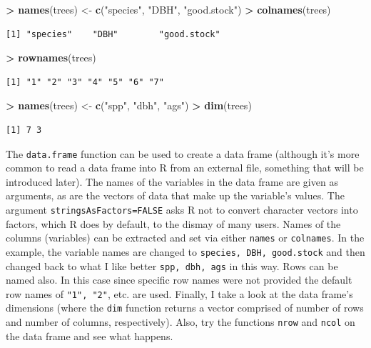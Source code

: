 \documentclass[]{krantz}
\makeatletter
\newenvironment{Shaded}{\begin{snugshade}}{\end{snugshade}}
\newcommand{\KeywordTok}[1]{\textcolor[rgb]{0.27,0.27,0.27}{\textbf{#1}}}
\newcommand{\StringTok}[1]{\textcolor[rgb]{0.5,0.5,0.5}{#1}}
\newcommand{\OperatorTok}[1]{\textcolor[rgb]{0.43,0.43,0.43}{\textbf{#1}}}
\newcommand{\NormalTok}[1]{#1}
\newenvironment{kframe}{%
\medskip{}
\setlength{\fboxsep}{.8em}
 \def\at@end@of@kframe{}%
 \ifinner\ifhmode%
  \def\at@end@of@kframe{\end{minipage}}%
  \begin{minipage}{\columnwidth}%
 \fi\fi%
 \def\FrameCommand##1{\hskip\@totalleftmargin \hskip-\fboxsep
 \colorbox{shadecolor}{##1}\hskip-\fboxsep
     \hskip-\linewidth \hskip-\@totalleftmargin \hskip\columnwidth}%
 \MakeFramed {\advance\hsize-\width
   \@totalleftmargin\z@ \linewidth\hsize
   \@setminipage}}%
 {\par\unskip\endMakeFramed%
 \at@end@of@kframe}
\renewenvironment{Shaded}{\begin{kframe}}{\end{kframe}}
\theoremstyle{definition}
\theoremstyle{definition}
\theoremstyle{definition}
\theoremstyle{remark}
\makeatother
\begin{document}
\begin{Shaded}
\begin{Highlighting}[]
\OperatorTok{>}\StringTok{ }\KeywordTok{names}\NormalTok{(trees) <-}\StringTok{ }\KeywordTok{c}\NormalTok{(}\StringTok{"species"}\NormalTok{, }\StringTok{"DBH"}\NormalTok{, }\StringTok{"good.stock"}\NormalTok{)}
\OperatorTok{>}\StringTok{ }\KeywordTok{colnames}\NormalTok{(trees)}
\end{Highlighting}
\end{Shaded}

\begin{verbatim}
[1] "species"    "DBH"        "good.stock"
\end{verbatim}

\begin{Shaded}
\begin{Highlighting}[]
\OperatorTok{>}\StringTok{ }\KeywordTok{rownames}\NormalTok{(trees)}
\end{Highlighting}
\end{Shaded}

\begin{verbatim}
[1] "1" "2" "3" "4" "5" "6" "7"
\end{verbatim}

\begin{Shaded}
\begin{Highlighting}[]
\OperatorTok{>}\StringTok{ }\KeywordTok{names}\NormalTok{(trees) <-}\StringTok{ }\KeywordTok{c}\NormalTok{(}\StringTok{"spp"}\NormalTok{, }\StringTok{"dbh"}\NormalTok{, }\StringTok{"ags"}\NormalTok{)}
\OperatorTok{>}\StringTok{ }\KeywordTok{dim}\NormalTok{(trees)}
\end{Highlighting}
\end{Shaded}

\begin{verbatim}
[1] 7 3
\end{verbatim}

The \texttt{data.frame} function can be used to create a data frame
(although it's more common to read a data frame into R from an external
file, something that will be introduced later). The names of the
variables in the data frame are given as arguments, as are the vectors
of data that make up the variable's values. The argument
\texttt{stringsAsFactors=FALSE} asks R not to convert character vectors
into factors, which R does by default, to the dismay of many users.
Names of the columns (variables) can be extracted and set via either
\texttt{names} or \texttt{colnames}. In the example, the variable names
are changed to \texttt{species,\ DBH,\ good.stock} and then changed back
to what I like better \texttt{spp,\ dbh,\ ags} in this way. Rows can be
named also. In this case since specific row names were not provided the
default row names of \texttt{"1",\ "2"}, etc. are used. Finally, I take
a look at the data frame's dimensions (where the \texttt{dim} function
returns a vector comprised of number of rows and number of columns,
respectively). Also, try the functions \texttt{nrow} and \texttt{ncol}
on the data frame and see what happens.
\end{document}
